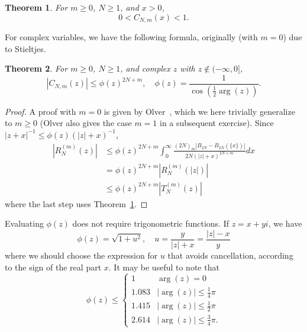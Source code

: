 \documentclass[reqno]{amsart}
\newtheorem{theorem}{Theorem}[section]
\theoremstyle{definition}
\begin{document}
\begin{theorem}
\label{thm:stirlingboundreal}
For $m \ge 0$, $N \ge 1$, and $x > 0$,
\begin{equation}
0 < C_{N,m}(x) < 1.
\end{equation}
\end{theorem}

For complex variables,
we have the following formula,
originally (with $m = 0$) due to Stieltjes.

\begin{theorem}
For $m \ge 0$, $N \ge 1$, and complex $z$ with $z \not \in (-\infty, 0]$,
\begin{equation}
|C_{N,m}(z)| \le \phi(z)^{2N+m}, \quad \phi(z) = \frac{1}{\cos(\tfrac{1}{2} \operatorname{arg}(z))}.
\label{eq:stirbound1}
\end{equation}
\end{theorem}

\begin{proof}
A proof with $m = 0$ is given by Olver~\cite[Chapter 8]{Olver1997}, which we here trivially generalize to $m \ge 0$ (Olver also
gives the case $m = 1$ in a subsequent exercise).
Since $|z+x|^{-1} \le\phi(z) (|z| + x)^{-1}$,
\begin{align*}
\left| R_N^{(m)}(z) \right| & \le \phi(z)^{2N+m} \int_0^{\infty} \frac{(2N)_{m} |B_{2N} - B_{2N}(\{x\})|}{2N {(|z| + x)}^{2N+m}} dx \\
                            & = \phi(z)^{2N+m} |R_N^{(m)}(|z|)| \\
                            & \le \phi(z)^{2N+m} |T_N^{(m)}(z)|
\end{align*}
where the last step uses Theorem~\ref{thm:stirlingboundreal}.
\end{proof}

Evaluating $\phi(z)$ does not require trigonometric functions.
If $z = x+yi$, we have
\begin{equation}
\phi(z) = \sqrt{1 + u^2}, \quad u = \frac{y}{|z| + x} = \frac{|z| - x}{y}
\end{equation}
where we should choose the expression for $u$ that avoids cancellation,
according to the sign of the real part $x$. It may be useful to note that
\begin{equation}
\phi(z) \le \begin{cases}
    1 & \operatorname{arg}(z) = 0 \\
    1.083 & |\operatorname{arg}(z)| \le \tfrac{1}{4} \pi \\
    1.415 & |\operatorname{arg}(z)| \le \tfrac{1}{2} \pi \\
    2.614 & |\operatorname{arg}(z)| \le \tfrac{3}{4} \pi.
\end{cases}
\end{equation}
\end{document}
